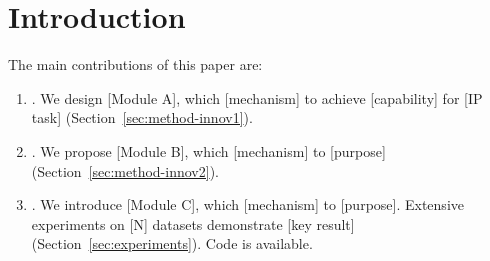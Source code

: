 \documentclass[journal,onecolumn,draftcls]{IEEEtran}
\begin{document}
\section{Introduction}
\label{sec:introduction}







The main contributions of this paper are:
\begin{enumerate}
  \item [Innovation 1 contribution]. We design [Module A], which [mechanism]
        to achieve [capability] for [IP task] (Section~\ref{sec:method-innov1}).
  \item [Innovation 2 contribution]. We propose [Module B], which [mechanism]
        to [purpose] (Section~\ref{sec:method-innov2}).
  \item [Innovation 3 contribution]. We introduce [Module C], which [mechanism]
        to [purpose]. Extensive experiments on [N] datasets demonstrate
        [key result] (Section~\ref{sec:experiments}). Code is available.
\end{enumerate}
\end{document}
